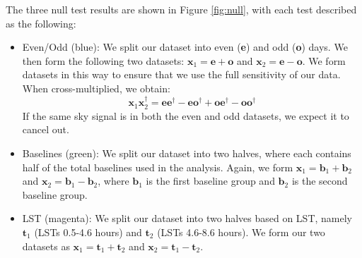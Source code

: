 \documentclass[preprint2,numberedappendix,tighten]{aastex6}  %
\begin{document}
The three null test results are shown in Figure \ref{fig:null}, with each test described as the following:

\begin{itemize}
\item Even/Odd (blue): We split our dataset into even (\textbf{e}) and odd (\textbf{o}) days. We then form the following two datasets: $\textbf{x}_{1} = \textbf{e} + \textbf{o}$ and $\textbf{x}_{2} = 
\textbf{e} - \textbf{o}$. We form datasets in this way to ensure that we use the full sensitivity of our data. When cross-multiplied, we obtain:
\begin{equation}
\textbf{x}_{1}\textbf{x}_{2}^{\dagger} = \textbf{ee}^{\dagger} - \textbf{eo}^{\dagger} + \textbf{oe}^{\dagger} - \textbf{oo}^{\dagger}
\end{equation}
If the same sky signal is in both the even and odd datasets, we expect it to cancel out.
\item Baselines (green): We split our dataset into two halves, where each contains half of the total baselines used in the 
analysis. Again, we form $\textbf{x}_{1} = \textbf{b}_{1} + \textbf{b}_{2}$ and $\textbf{x}_{2} = \textbf{b}_{1} - \textbf{b}_{2}$, where $\textbf{b}_{1}$ is the first baseline 
group and $\textbf{b}_{2}$ is the second baseline group.
\item LST (magenta): We split our dataset into two halves based on LST, namely $\textbf{t}_{1}$ (LSTs 0.5-4.6 hours) and $\textbf{t}_{2}$ (LSTs 
4.6-8.6 hours). We form our two datasets as $\textbf{x}_{1} = \textbf{t}_{1} + \textbf{t}_{2}$ and $\textbf{x}_{2} = \textbf{t}_{1} -\textbf{t}_{2}$.
\end{itemize}
\end{document}
